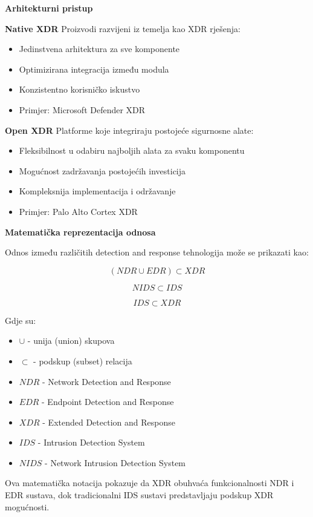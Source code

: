 \textbf{Arhitekturni pristup}

\textbf{Native XDR}
Proizvodi razvijeni iz temelja kao XDR rješenja:
\begin{itemize}
\item Jedinstvena arhitektura za sve komponente
\item Optimizirana integracija između modula
\item Konzistentno korisničko iskustvo
\item Primjer: Microsoft Defender XDR
\end{itemize}

\textbf{Open XDR}
Platforme koje integriraju postojeće sigurnosne alate:
\begin{itemize}
\item Fleksibilnost u odabiru najboljih alata za svaku komponentu
\item Mogućnost zadržavanja postojećih investicija
\item Kompleksnija implementacija i održavanje
\item Primjer: Palo Alto Cortex XDR
\end{itemize}

\textbf{Matematička reprezentacija odnosa}

Odnos između različitih detection and response tehnologija može se prikazati kao:

\begin{equation}
(NDR \cup EDR) \subset XDR
\end{equation}

\begin{equation}
NIDS \subset IDS
\end{equation}

\begin{equation}
IDS \subset XDR
\end{equation}

Gdje su:
\begin{itemize}
\item $\cup$ - unija (union) skupova
\item $\subset$ - podskup (subset) relacija
\item $NDR$ - Network Detection and Response
\item $EDR$ - Endpoint Detection and Response  
\item $XDR$ - Extended Detection and Response
\item $IDS$ - Intrusion Detection System
\item $NIDS$ - Network Intrusion Detection System
\end{itemize}
Ova matematička notacija pokazuje da XDR obuhvaća funkcionalnosti NDR i EDR sustava, dok tradicionalni IDS sustavi predstavljaju podskup XDR mogućnosti.


